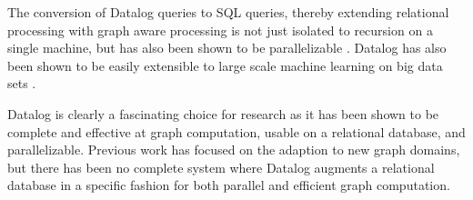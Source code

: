 \documentclass[11pt,letterpaper]{article}
\begin{document}
The conversion of Datalog queries to SQL queries, thereby extending relational processing with graph aware processing is not just isolated to recursion on a single machine, but has also been shown to be parallelizable \cite{seo_distributed_2013}. Datalog has also been shown to be easily extensible to large scale machine learning on big data sets \cite{bu_scaling_2012}.

Datalog is clearly a fascinating choice for research as it has been shown to be complete and effective at graph computation, usable on a relational database, and parallelizable. Previous work has focused on the adaption to new graph domains, but there has been no complete system where Datalog augments a relational database in a specific fashion for both parallel and efficient graph computation.

%
%
%
%
\end{document}
